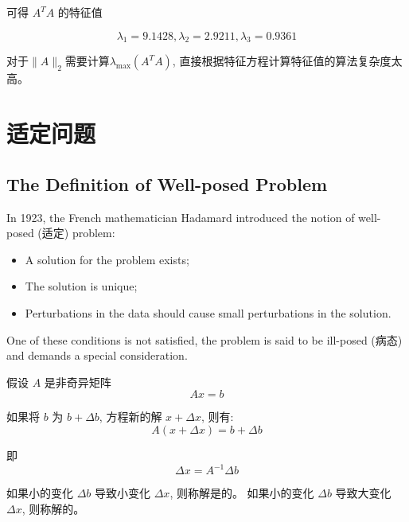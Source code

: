 \begin{example}
可得 $ A^{T} A $ 的特征值

\begin{equation} \lambda_{1}=9.1428, \lambda_{2}=2.9211, \lambda_{3}=0.9361 \end{equation}

\end{example}

\begin{remark}
    对于$\|A\|_{2}$需要计算$\lambda_{\max }\left(A^{T} A\right)$, 直接根据特征方程计算特征值的算法复杂度太高。
\end{remark}

\chapter{适定问题}

\section{The Definition of Well-posed Problem}

In 1923, the French mathematician Hadamard introduced the notion of well-posed (适定)  problem:

\begin{itemize}
    \item A solution for the problem exists;
    \item The solution is unique;
    \item Perturbations in the data should cause small perturbations in the solution.
\end{itemize}

One of these conditions is not satisfied, the problem is said to be ill-posed (病态) and demands a special consideration.

\begin{definition}
    假设 $ A $ 是非奇异矩阵 \begin{equation} A x=b \end{equation}

    如果将 $ b $ 为 $ b+\Delta b $, 方程新的解 $ x+\Delta x $, 则有:
\begin{equation}
A(x+\Delta x)=b+\Delta b
\end{equation}

即
\begin{equation}
\Delta x=A^{-1} \Delta b
\end{equation}

如果小的变化 $ \Delta b $ 导致小变化 $ \Delta x $, 则称解是的。 如果小的变化 $ \Delta b $ 导致大变化 $ \Delta x $, 则称解的。 
\end{definition}


